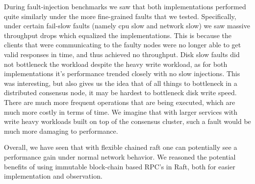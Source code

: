 During fault-injection benchmarks we saw that both implementations performed quite similarly under the more fine-grained faults that we tested.
Specifically, under certain fail-slow faults (namely cpu slow and network slow) we saw massive throughput drops which equalized the implementations. 
This is because the clients that were communicating to the faulty nodes were no longer able to get valid responses in time, and thus achieved no throughput.
Disk slow faults did not bottleneck the workload despite the heavy write workload, as for both implementations it's performance trended closely with no slow injections.
This was interesting, but also gives us the idea that of all things to bottleneck in a distributed consensus node, it may be hardest to bottleneck disk write speed. 
There are much more frequent operations that are being executed, which are much more costly in terms of time. 
We imagine that with larger services with write heavy workloads built on top of the consensus cluster, such a fault would be much more damaging to performance.

Overall, we have seen that with flexible chained raft one can potentially see a performance gain under normal network behavior.
We reasoned the potential benefits of using immutable block-chain based RPC's in Raft, both for easier implementation and observation.




